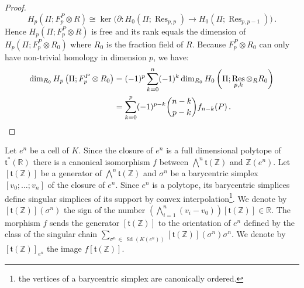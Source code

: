 \documentclass[AHL,Unicode,longabstracts,published]{cedram}
\newcommand{\R}{\mathbb{R}}
\newcommand{\Z}{\mathbb{Z}}
\renewcommand{\t}{\mathfrak{t}}
\DeclareMathOperator{\Sd}{Sd}
\DeclareMathOperator{\Res}{Res}
\newcommand{\ori}{[\t(\Z)]}
\begin{document}
\begin{proof}
\begin{equation*}
H_{p}\left(\Pi;F^{P}_p\otimes R\right)\cong \ker\big(\partial\colon H_0\left(\Pi;\Res_{p,p}\right)\rightarrow H_0\left(\Pi;\Res_{p,p-1}\right) \big)\,.
\end{equation*}
Hence $H_{p}(\Pi;F^{P}_p\otimes R)$ is free and its rank equals the dimension of $H_{p}(\Pi;F^{P}_p\otimes R_0)$ where $R_0$ is the fraction field of $R$. Because $F^{P}_p\otimes R_0$ can only have non-trivial homology in dimension $p$, we have:
\begin{equation*}
\begin{split}
\dim_{R_0} H_p\left(\Pi;F^{P}_p\otimes R_0\right) &=(-1)^p\sum_{k=0}^n(-1)^k\dim_{R_0} H_0\left(\Pi;\Res_{p,k}\otimes_R R_0\right) \\
& = \sum_{k=0}^p(-1)^{p-k} \binom{n-k}{p-k}f_{n-k}(P)\,.\qedhere
\end{split}
\end{equation*}
\end{proof}

\begin{defi}\label{definition:Global_orientation}
Let $e^n$ be a cell of $K$. Since the closure of $e^n$ is a full dimensional polytope of $\t^*(\R)$ there is a canonical isomorphism $f$ between $\bigwedge^n\t(\Z)$ and $\Z(e^n)$. Let $\ori$ be a generator of $\bigwedge^n\t(\Z)$ and $\sigma^n$ be a barycentric simplex $[v_0;\dots;v_n]$ of the closure of $e^n$. Since $e^n$ is a polytope, its barycentric simplices define singular simplices of its support by convex interpolation\footnote{the vertices of a barycentric simplex are canonically ordered.}. We denote by $\ori(\sigma^n)$ the sign of the number $(\bigwedge_{i=1}^n(v_i-v_0))\ori\in\R$. The morphism $f$ sends the generator $\ori$ to the orientation of $e^n$ defined by the class of the singular chain $\sum_{\sigma^n\,\in\,\Sd(K(e^n))}\ori(\sigma^n)\sigma^n$. We denote by $\ori_{e^n}$ the image $f\ori$.
\end{defi}
\end{document}
